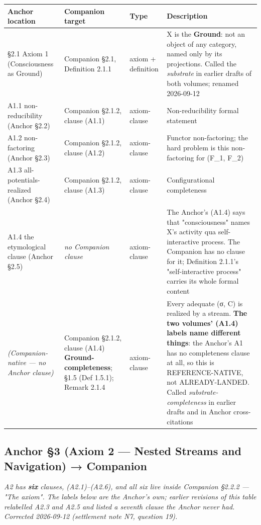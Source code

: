 \documentclass[11pt, openany]{book}
\begin{document}
\begingroup\setlength{\tabcolsep}{3pt}\renewcommand{\arraystretch}{1.15}\footnotesize
\begin{center}
\begin{tabular}{p{0.53in} p{0.76in} p{0.53in} p{2.47in}}
\toprule
Anchor location & Companion target & Type & Description \\
\midrule
§2.1 Axiom 1 (Consciousness as Ground) & Companion §2.1, Definition 2.1.1 & axiom + definition & X is the \textbf{Ground}: not an object of any category, named only by its projections. Called the \textit{substrate} in earlier drafts of both volumes; renamed 2026-09-12 \\
A1.1 non-reducibility (Anchor §2.2) & Companion §2.1.2, clause (A1.1) & axiom-clause & Non-reducibility formal statement \\
A1.2 non-factoring (Anchor §2.3) & Companion §2.1.2, clause (A1.2) & axiom-clause & Functor non-factoring; the hard problem is this non-factoring for (F\_\allowbreak{}1, F\_\allowbreak{}2) \\
A1.3 all-potentials-realized (Anchor §2.4) & Companion §2.1.2, clause (A1.3) & axiom-clause & Configurational completeness \\
A1.4 the etymological clause (Anchor §2.5) & \textit{no Companion clause} & axiom-clause & The Anchor's (A1.4) says that "consciousness" names X's activity qua self-interactive process. The Companion has no clause for it; Definition 2.1.1's "self-interactive process" carries its whole formal content \\
\textit{(Companion-native --- no Anchor clause)} & Companion §2.1.2, clause (A1.4) \textbf{Ground-completeness}; §1.5 (Def 1.5.1); Remark 2.1.4 & axiom-clause & Every adequate (σ, C) is realized by a stream. \textbf{The two volumes' (A1.4) labels name different things}: the Anchor's A1 has no completeness clause at all, so this is REFERENCE-NATIVE, not ALREADY-LANDED. Called \textit{substrate-completeness} in earlier drafts and in Anchor cross-citations \\
\bottomrule
\end{tabular}
\end{center}
\endgroup
\subsection{Anchor §3 (Axiom 2 --- Nested Streams and Navigation) → Companion}

\textit{A2 has \textbf{six} clauses, (A2.1)–(A2.6), and all six live inside Companion §2.2.2 --- "The axiom". The labels below are the Anchor's own; earlier revisions of this table relabelled A2.3 and A2.5 and listed a seventh clause the Anchor never had. Corrected 2026-09-12 (settlement note N7, question 19).}
\end{document}
